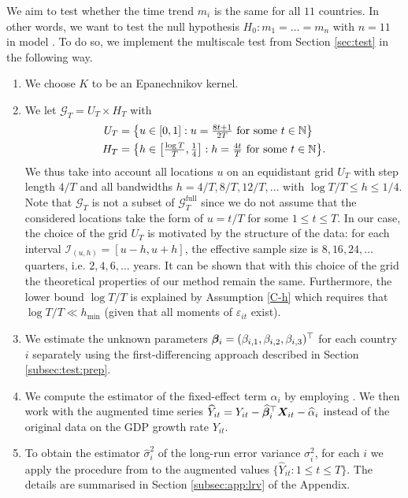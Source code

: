 \documentclass[a4paper,12pt]{article}
\makeatletter
\renewcommand{\eqref}[1]{\tagform@{\ref{#1}}}
\makeatother
\begin{document}
We aim to test whether the time trend $m_i$ is the same for all $11$ countries. In other words, we want to test the null hypothesis $H_0: m_1 = \ldots = m_n$ with $n = 11$ in model \eqref{eq:model:app2}. To do so, we implement the multiscale test from Section \ref{sec:test} in the following way. 
\begin{enumerate}
\item We choose $K$ to be an Epanechnikov kernel.
\item We let $\mathcal{G}_T = U_T \times H_T$ with 
\begin{align*}
U_T & = \big\{ u \in [0,1]: u = \textstyle{\frac{8t + 1}{2T}} \text{ for some } t \in \mathbb{N} \big\} \\
H_T & = \big\{ h \in \big[ \textstyle{\frac{\log T}{T}}, \textstyle{\frac{1}{4}} \big]:  h = \textstyle{\frac{4t}{T}} \text{ for some } t \in \mathbb{N} \big\}. 
\end{align*}
We thus take into account all locations $u$ on an equidistant grid $U_T$ with step length $4/T$ and all bandwidths $h=4/T, 8/T, 12/T,\ldots$ with $\log T /T \le h \le 1/4$. Note that $\mathcal{G}_T$ is not a subset of $\mathcal{G}_T^{\text{full}}$ since we do not assume that the considered locations take the form of $u = t/T$ for some $1 \leq t \leq T$. In our case, the choice of the grid $U_T$ is motivated by the structure of the data: for each interval $\mathcal{I}_{(u, h)} = [u-h, u+h]$, the effective sample size is $8, 16, 24, \ldots$ quarters, i.e. $2, 4, 6, \ldots$ years. It can be shown that with this choice of the grid the theoretical properties of our method remain the same. Furthermore, the lower bound $\log T / T$ is explained by Assumption \ref{C-h} which requires that $\log T /T \ll h_{\min}$ (given that all moments of $\varepsilon_{it}$ exist).
\item We estimate the unknown parameters $\bm{\beta}_i = (\beta_{i, 1}, \beta_{i, 2}, \beta_{i, 3})^\top$ for each country $i$ separately using the first-differencing approach described in Section \ref{subsec:test:prep}.
\item We compute the estimator of the fixed-effect term $\alpha_i$ by employing \eqref{eq:alpha:est}. We then work with the augmented time series $\widehat{Y}_{it} = Y_{it} - \widehat{\bm{\beta}}_i^\top \boldsymbol{X}_{it} - \widehat{\alpha}_{i}$ instead of the original data on the GDP growth rate $Y_{it}$.
\item To obtain the estimator $\hat{\sigma}_i^2$ of the long-run error variance $\sigma^2_i$, for each $i$ we apply the procedure from \cite{KhismatullinaVogt2020} to the augmented values \linebreak $\{\widehat{Y}_{it}: 1\leq t \leq T\}$. The details are summarised in Section \ref{subsec:app:lrv} of the Appendix. %

\end{enumerate}
\end{document}
